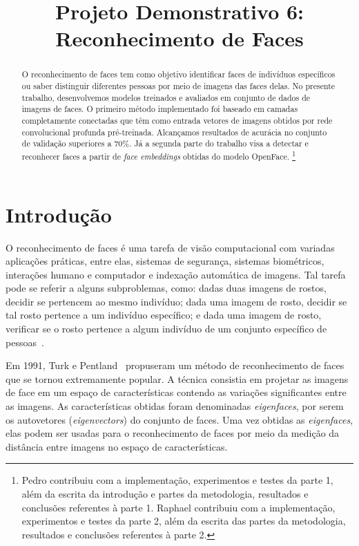 \documentclass{bmvc2k}
\title{Projeto Demonstrativo 6: Reconhecimento de Faces}
\begin{document}
\begin{NoHyper}
\maketitle
\end{NoHyper}

\begin{abstract}
O reconhecimento de faces tem como objetivo identificar faces de indivíduos específicos ou saber distinguir diferentes pessoas por meio de imagens das faces delas. No presente trabalho, desenvolvemos modelos treinados e avaliados em conjunto de dados de imagens de faces. O primeiro método implementado foi baseado em camadas completamente conectadas que têm como entrada vetores de imagens obtidos por rede convolucional profunda pré-treinada. Alcançamos resultados de acurácia no conjunto de validação superiores a 70\%. Já a segunda parte do trabalho visa a detectar e reconhecer faces a partir de \textit{face embeddings} obtidas do modelo OpenFace.
\footnote{Pedro contribuiu com a implementação, experimentos e testes da parte 1, além da escrita da introdução e partes da metodologia, resultados e conclusões referentes à parte 1. Raphael contribuiu com a implementação, experimentos e testes da parte 2, além da escrita das partes da metodologia, resultados e conclusões referentes à parte 2.}
\end{abstract}

\section{Introdução}
\label{sec:intro}
O reconhecimento de faces é uma tarefa de visão computacional com variadas aplicações práticas, entre elas, sistemas de segurança, sistemas biométricos, interações humano e computador e indexação automática de imagens. Tal tarefa pode se referir a alguns subproblemas, como: dadas duas imagens de rostos, decidir se pertencem ao mesmo indivíduo; dada uma imagem de rosto, decidir se tal rosto pertence a um indivíduo específico; e dada uma imagem de rosto, verificar se o rosto pertence a algum indivíduo de um conjunto específico de pessoas~\cite{lfw}.

Em 1991, Turk e Pentland~\cite{eigenfaces} propuseram um método de reconhecimento de faces que se tornou extremamente popular. A técnica consistia em projetar as imagens de face em um espaço de características contendo as variações significantes entre as imagens. As características obtidas foram denominadas \textit{eigenfaces}, por serem os autovetores (\textit{eigenvectors}) do conjunto de faces. Uma vez obtidas as \textit{eigenfaces}, elas podem ser usadas para o reconhecimento de faces por meio da medição da distância entre imagens no espaço de características.
\end{document}
